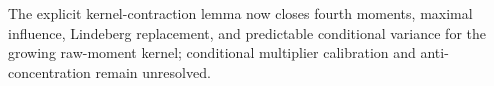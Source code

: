 The explicit kernel-contraction lemma now closes fourth moments, maximal influence, Lindeberg replacement, and predictable conditional variance for the growing raw-moment kernel; conditional multiplier calibration and anti-concentration remain unresolved.